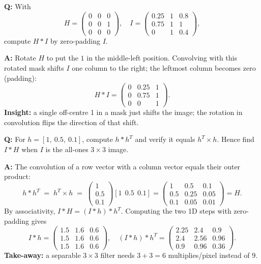 \begin{exbox}
\textbf{Q:} With
\[
H = \begin{pmatrix} 0 & 0 & 0 \\ 0 & 0 & 1 \\ 0 & 0 & 0 \end{pmatrix}, \quad I = \begin{pmatrix} 0.25 & 1 & 0.8 \\ 0.75 & 1 & 1 \\ 0 & 1 & 0.4 \end{pmatrix},
\]
compute $H \ast I$ by zero-padding $I$.

\textbf{A:} Rotate $H$ to put the $1$ in the middle-left position. Convolving with this rotated mask shifts $I$ one column to the right; the leftmost column becomes zero (padding):
\[
H \ast I = \begin{pmatrix} 0 & 0.25 & 1 \\ 0 & 0.75 & 1 \\ 0 & 0 & 1 \end{pmatrix}.
\]
\textbf{Insight:} a single off-centre 1 in a mask just shifts the image; the rotation in convolution flips the direction of that shift.
\end{exbox}

\begin{exbox}
\textbf{Q:} For $h = [1,\ 0.5,\ 0.1]$, compute $h \ast h^T$ and verify it equals $h^T \times h$. Hence find $I \ast H$ when $I$ is the all-ones $3 \times 3$ image.

\textbf{A:} The convolution of a row vector with a column vector equals their outer product:
\[
h \ast h^T \;=\; h^T \times h \;=\; \begin{pmatrix} 1 \\ 0.5 \\ 0.1 \end{pmatrix} [1\ \ 0.5\ \ 0.1] = \begin{pmatrix} 1 & 0.5 & 0.1 \\ 0.5 & 0.25 & 0.05 \\ 0.1 & 0.05 & 0.01 \end{pmatrix} = H.
\]
By associativity, $I \ast H = (I \ast h) \ast h^T$. Computing the two 1D steps with zero-padding gives
\[
I \ast h = \begin{pmatrix} 1.5 & 1.6 & 0.6 \\ 1.5 & 1.6 & 0.6 \\ 1.5 & 1.6 & 0.6 \end{pmatrix}, \quad
(I \ast h) \ast h^T = \begin{pmatrix} 2.25 & 2.4 & 0.9 \\ 2.4 & 2.56 & 0.96 \\ 0.9 & 0.96 & 0.36 \end{pmatrix}.
\]
\textbf{Take-away:} a separable $3 \times 3$ filter needs $3+3=6$ multiplies/pixel instead of $9$.
\end{exbox}

